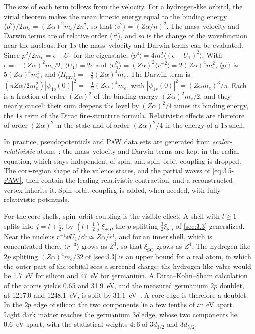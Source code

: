The size of each term follows from the velocity. For a hydrogen-like orbital, the virial theorem makes the mean kinetic energy equal to the binding energy, $\langle p^2\rangle/2m_e = (Z\alpha)^2m_e/2n^2$, so that $\langle v^2\rangle = (Z\alpha/n)^2$. The mass--velocity and Darwin terms are of relative order $\langle v^2\rangle$, and so is the change of the wavefunction near the nucleus. For $1s$ the mass--velocity and Darwin terms can be evaluated. Since $p^2/2m_e = \epsilon - U_1$ for the eigenstate, $\langle p^4\rangle = 4m_e^2\langle(\epsilon - U_1)^2\rangle$. With $\epsilon = -(Z\alpha)^2m_e/2$, $\langle U_1\rangle = 2\epsilon$ and $\langle U_1^2\rangle = (Z\alpha)^2\langle r^{-2}\rangle = 2(Z\alpha)^4m_e^2$, $\langle p^4\rangle$ is $5(Z\alpha)^4m_e^4$, and $\langle H_{\mathrm{mv}}\rangle = -\tfrac58(Z\alpha)^4m_e$. The Darwin term is $(\pi Z\alpha/2m_e^2)|\psi_{1s}(0)|^2 = +\tfrac12(Z\alpha)^4m_e$, with $|\psi_{1s}(0)|^2 = (Z\alpha m_e)^3/\pi$. Each is a fraction of order $(Z\alpha)^2$ of the binding energy $(Z\alpha)^2m_e/2$, and they nearly cancel: their sum deepens the level by $(Z\alpha)^2/4$ times its binding energy, the $1s$ term of the Dirac fine-structure formula. Relativistic effects are therefore of order $(Z\alpha)^2$ in the state and of order $(Z\alpha)^2/4$ in the energy of a $1s$ shell.

In practice, pseudopotentials and PAW data sets are generated from \emph{scalar-relativistic} atoms~\cite{koelling1977technique}: the mass--velocity and Darwin terms are kept in the radial equation, which stays independent of spin, and spin--orbit coupling is dropped. The core-region shape of the valence states, and the partial waves of \cref{eq:3.5-PAW}, then contain the leading relativistic contraction, and a reconstructed vertex inherits it. Spin--orbit coupling is added, when needed, with fully relativistic potentials.

For the core shells, spin--orbit coupling is the visible effect. A shell with $l \ge 1$ splits into $j = l \pm \tfrac12$, by $(l + \tfrac12)\xi_{\mathrm{SO}}$, the $p$ splitting $\tfrac32\xi_{\mathrm{SO}}$ of \cref{sec:3.3} generalized. Near the nucleus $r^{-1}\dd U_1/\dd r \simeq Z\alpha/r^3$, and for an inner shell, which is concentrated there, $\langle r^{-3}\rangle$ grows as $Z^3$, so that $\xi_{\mathrm{SO}}$ grows as $Z^4$. The hydrogen-like $2p$ splitting $(Z\alpha)^4m_e/32$ of \cref{sec:3.3} is an upper bound for a real atom, in which the outer part of the orbital sees a screened charge: the hydrogen-like value would be \SI{1.7}{eV} for silicon and \SI{47}{eV} for germanium. A Dirac--Kohn--Sham calculation of the atoms yields 0.65 and \SI{31.9}{eV}, and the measured germanium $2p$ doublet, at 1217.0 and \SI{1248.1}{eV}, is split by \SI{31.1}{eV}~\cite[Table~1-1]{williams2009electron}. A core edge is therefore a doublet. In the $2p$ edge of silicon the two components lie a few tenths of an eV apart. Light dark matter reaches the germanium $3d$ edge, whose two components lie \SI{0.6}{eV} apart, with the statistical weights $4:6$ of $3d_{3/2}$ and $3d_{5/2}$.

